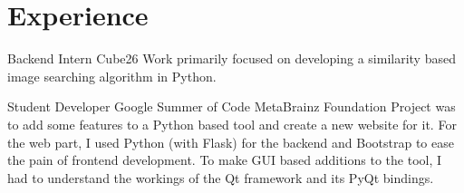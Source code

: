 \documentclass[12pt, a4paper, sans]{moderncv}
\title{}
\begin{document}
\maketitle

\section{Experience}

        {Backend Intern}
        {Cube26}
        {}
        {}
        {Work primarily focused on developing a similarity based image searching algorithm in Python.}
        \vspace*{0.2\baselineskip}

        {Student Developer}
        {Google Summer of Code}
        {MetaBrainz Foundation}
        {}
        {Project was to add some features to a Python based tool and create a new website for it. For the web part, I used Python (with Flask) for the backend and Bootstrap to ease the pain of frontend development. To make GUI based additions to the tool, I had to understand the workings of the Qt framework and its PyQt bindings.}
        \vspace*{0.2\baselineskip}
\end{document}
